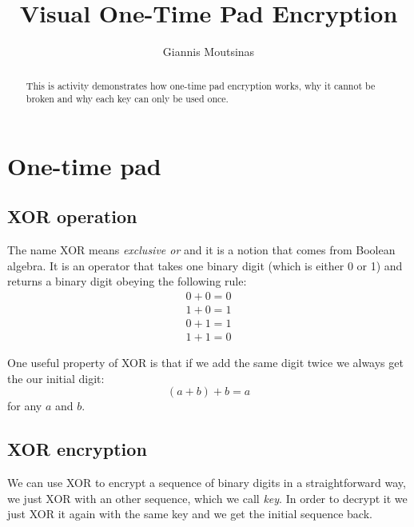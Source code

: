 \documentclass[a4paper,10pt]{article}
\title{Visual One-Time Pad Encryption}
\author{Giannis Moutsinas}
\begin{document}
\maketitle

\thispagestyle{empty}

\begin{abstract}
 This is activity demonstrates how one-time pad encryption works, why it cannot be broken and why each key can only be used once.
\end{abstract}

\vfill

\doclicenseThis

\newpage

\section{One-time pad}

\subsection{XOR operation}

The name XOR means \textit{exclusive or} and it is a notion that comes from Boolean algebra. It is an operator that takes one binary digit (which is either 0 or 1) and returns a binary digit obeying the following rule:
\begin{align*}
0+0=0\\
1+0=1\\
0+1=1\\
1+1=0
\end{align*}

One useful property of XOR is that if we add the same digit twice we always get the our initial digit:
\begin{equation*}
(a+b)+b=a
\end{equation*}
for any $a$ and $b$.

\subsection{XOR encryption}

We can use XOR to encrypt a sequence of binary digits in a straightforward way, we just XOR with an other sequence, which we call \textit{key}. In order to decrypt it we just XOR it again with the same key and we get the initial sequence back.
\end{document}
